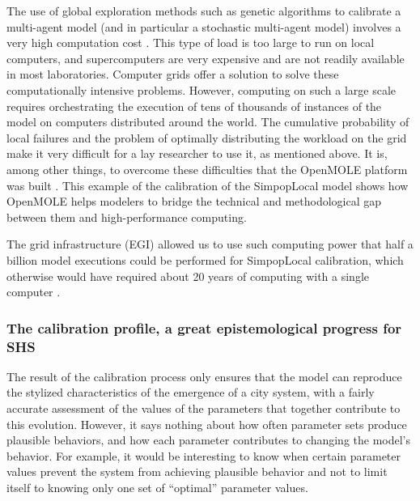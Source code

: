 \documentclass[10pt]{article}
\begin{document}
The use of global exploration methods such as genetic algorithms to calibrate a multi-agent model (and in particular a stochastic multi-agent model) involves a very high computation cost \citep{sharma2006multi}. This type of load is too large to run on local computers, and supercomputers are very expensive and are not readily available in most laboratories. Computer grids offer a solution to solve these computationally intensive problems. However, computing on such a large scale requires orchestrating the execution of tens of thousands of instances of the model on computers distributed around the world. The cumulative probability of local failures and the problem of optimally distributing the workload on the grid make it very difficult for a lay researcher to use it, as mentioned above. It is, among other things, to overcome these difficulties that the OpenMOLE platform was built \citep{reuillon2010declarative,reuillon2013openmole}. This example of the calibration of the SimpopLocal model shows how OpenMOLE helps modelers to bridge the technical and methodological gap between them and high-performance computing.

The grid infrastructure (EGI) allowed us to use such computing power that half a billion model executions could be performed for SimpopLocal calibration, which otherwise would have required about 20 years of computing with a single computer \citep{schmitt2015half}.


\subsubsection{The calibration profile, a great epistemological progress for SHS}

The result of the calibration process only ensures that the model can reproduce the stylized characteristics of the emergence of a city system, with a fairly accurate assessment of the values of the parameters that together contribute to this evolution. However, it says nothing about how often parameter sets produce plausible behaviors, and how each parameter contributes to changing the model’s behavior. For example, it would be interesting to know when certain parameter values prevent the system from achieving plausible behavior and not to limit itself to knowing only one set of ``optimal'' parameter values.
\end{document}
